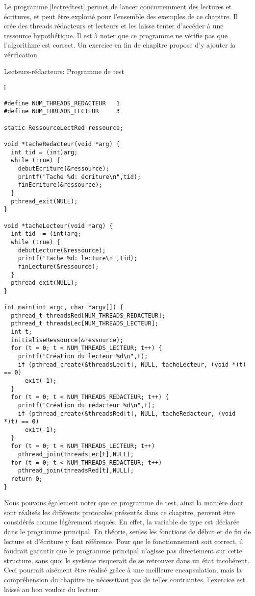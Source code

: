 Le programme \ref{lectredtest} permet de lancer concurremment des lectures et écritures, et peut être exploité pour l'ensemble des exemples de ce chapitre. Il crée des threads rédacteurs et lecteurs et les laisse tenter d'accéder à une ressource hypothétique. Il est à noter que ce programme ne vérifie pas que l'algorithme est correct. Un exercice en fin de chapitre propose d'y ajouter la vérification.

\begin{algorithm}[h!tp]
\caption{Lecteurs-rédacteurs: Programme de test}\label{lectredtest}
\begin{center}
\begin{tabular}{l}
\lstset{language=C++}
\begin{lstlisting}
#define NUM_THREADS_REDACTEUR   1
#define NUM_THREADS_LECTEUR     3

static RessourceLectRed ressource;

void *tacheRedacteur(void *arg) {
  int tid = (int)arg;
  while (true) {
    debutEcriture(&ressource);
    printf("Tache %d: écriture\n",tid);
    finEcriture(&ressource);
  }
  pthread_exit(NULL);
}

void *tacheLecteur(void *arg) {
  int tid  = (int)arg;
  while (true) {
    debutLecture(&ressource);
    printf("Tache %d: lecture\n",tid);
    finLecture(&ressource);
  }
  pthread_exit(NULL);
}

int main(int argc, char *argv[]) {
  pthread_t threadsRed[NUM_THREADS_REDACTEUR];
  pthread_t threadsLec[NUM_THREADS_LECTEUR];
  int t;
  initialiseRessource(&ressource);
  for (t = 0; t < NUM_THREADS_LECTEUR; t++) {
    printf("Création du lecteur %d\n",t);
    if (pthread_create(&threadsLec[t], NULL, tacheLecteur, (void *)t) == 0)
      exit(-1);
  }
  for (t = 0; t < NUM_THREADS_REDACTEUR; t++) {
    printf("Création du rédacteur %d\n",t);
    if (pthread_create(&threadsRed[t], NULL, tacheRedacteur, (void *)t) == 0)
      exit(-1);
  }
  for (t = 0; t < NUM_THREADS_LECTEUR; t++)
    pthread_join(threadsLec[t],NULL);
  for (t = 0; t < NUM_THREADS_REDACTEUR; t++)
    pthread_join(threadsRed[t],NULL);
  return 0;
}
\end{lstlisting}
\end{tabular}
\end{center}
\end{algorithm}

Nous pouvons également noter que ce programme de test, ainsi la manière dont sont réalisés les différents protocoles présentés dans ce chapitre, peuvent être considérés comme légèrement risqués. En effet, la variable de type  est déclarée dans le programme principal. En théorie, seules les fonctions de début et de fin de lecture et d'écriture y font référence. Pour que le fonctionnement soit correct, il faudrait garantir que le programme principal n'agisse pas directement sur cette structure, sans quoi le système risquerait de se retrouver dans un état incohérent. Ceci pourrait aisément être réalisé grâce à une meilleure encapsulation, mais la compréhension du chapitre ne nécessitant pas de telles contraintes, l'exercice est laissé au bon vouloir du lecteur.


